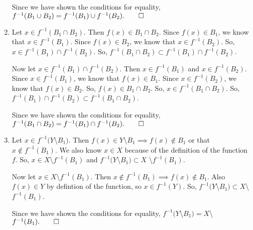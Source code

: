 \documentclass{report}
\begin{document}
\begin{enumerate}[label=\alph*.]
    Since we have shown the conditions for equality, $f^{-1}(B_1 \cup B_2) = f^{-1}(B_1) \cup f^{-1}(B_2). \qed$
    
    \item Let $x \in f^{-1}(B_1 \cap B_2)$. Then $f(x) \in B_1 \cap B_2$. Since $f(x) \in B_1$, we know that $x \in f^{-1}(B_1)$. Since $f(x) \in B_2$, we know that $x \in f^{-1}(B_2)$. So, $x \in f^{-1}(B_1) \cap f^{-1}(B_2)$. So, $f^{-1}(B_1 \cap B_2) \subset f^{-1}(B_1) \cap f^{-1}(B_2)$.
    
    Now let $x \in f^{-1}(B_1) \cap f^{-1}(B_2)$. Then $x \in f^{-1}(B_1)$ and $x \in f^{-1}(B_2)$. Since $x \in f^{-1}(B_1)$, we know that $f(x) \in B_1$. Since $x \in f^{-1}(B_2)$, we know that $f(x) \in B_2$. So, $f(x) \in B_1 \cap B_2$. So, $x \in f^{-1}(B_1 \cap B_2)$. So, $f^{-1}(B_1) \cap f^{-1}(B_2) \subset f^{-1}(B_1 \cap B_2)$.

    Since we have shown the conditions for equality, $f^{-1}(B_1 \cap B_2) = f^{-1}(B_1) \cap f^{-1}(B_2). \qed$

    \item Let $x \in f^{-1}(Y$\textbackslash$ B_1)$. Then $f(x) \in Y$\textbackslash$ B_1 \implies f(x) \not\in B_1$ or that $x \not\in f^{-1}(B_1)$. We also know $x \in X$ because of the definition of the function $f$. So, $x \in X$\textbackslash$ f^{-1}(B_1)$ and  $f^{-1}(Y$\textbackslash$ B_1) \subset X$ \textbackslash $f^{-1}(B_1)$.
    
    Now let $x \in X$\textbackslash$ f^{-1}(B_1)$. Then $x \not\in f^{-1}(B_1) \implies f(x) \not\in B_1$. Also $f(x) \in Y$ by defintion of the function, so $x \in f^{-1}(Y)$. So, $f^{-1}(Y$\textbackslash$ B_1) \subset X$\textbackslash$ f^{-1}(B_1)$. 

    Since we have shown the conditions for equality, $f^{-1}(Y$\textbackslash$ B_1) = X$\textbackslash$ f^{-1}(B_1). \qed$ 
\end{enumerate}

\end{document}
